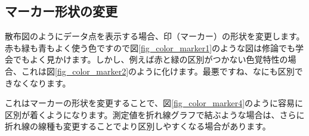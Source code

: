 \subsection{マーカー形状の変更}

散布図のようにデータ点を表示する場合、印（マーカー）の形状を変更します。赤も緑も青もよく使う色ですので図\ref{fig_color_marker1}のような図は修論でも学会でもよく見かけます。しかし、例えば赤と緑の区別がつかない色覚特性の場合、これは図\ref{fig_color_marker2}のように化けます。最悪ですね、なにも区別できなくなります。

これはマーカーの形状を変更することで、図\ref{fig_color_marker4}のように容易に区別が着くようになります。測定値を折れ線グラフで結ぶような場合は、さらに折れ線の線種も変更することでより区別しやすくなる場合があります。

\begin{figure}
  \centering
\end{figure}
